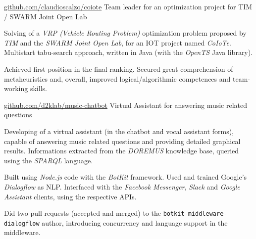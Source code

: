 



\begin{cventries}

	\cvproj
		{\href{https://github.com/claudioscalzo/coiote}{github.com/claudioscalzo/coiote}}
		{Team leader for an optimization project for TIM / SWARM Joint Open Lab}
		{}
		{}
		{
			\begin{cvitems} %
				\item {Solving of a \textit{VRP (Vehicle Routing Problem)} optimization problem proposed by \textit{TIM} and the \textit{SWARM Joint Open Lab}, for an IOT project named \textit{CoIoTe}. Multistart tabu-search approach, written in Java (with the \textit{OpenTS} Java library).}
				\item {Achieved first position in the final ranking. Secured great comprehension of metaheuristics and, overall, improved logical/algorithmic competences and team-working skills.}
			\end{cvitems}
		}

	\cvproj
		{\href{https://github.com/D2KLab/music-chatbot}{github.com/d2klab/music-chatbot}}
		{Virtual Assistant for answering music related questions}
		{}
		{}
		{
			\begin{cvitems} %
				\item {Developing of a virtual assistant (in the chatbot and vocal assistant forms), capable of answering music related questions and providing detailed graphical results. Informations extracted from the \textit{DOREMUS} knowledge base, queried using the \textit{SPARQL} language.}
				\item {Built using \textit{Node.js} code with the \textit{BotKit} framework. Used and trained Google's \textit{Dialogflow} as NLP. Interfaced with the \textit{Facebook Messenger}, \textit{Slack} and \textit{Google Assistant} clients, using the respective APIs.}
				\item {Did two pull requests (accepted and merged) to the \texttt{botkit-middleware-dialogflow} author, introducing concurrency and language support in the middleware.}
			\end{cvitems}
		}
	

\end{cventries}
